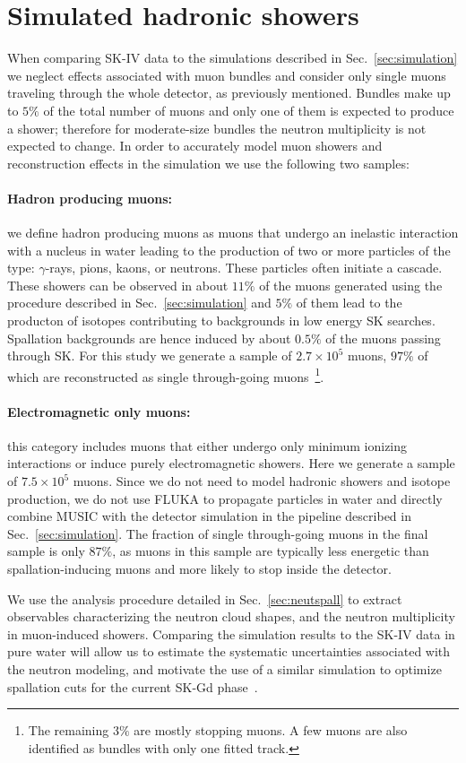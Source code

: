 \section{Simulated hadronic showers}
\label{sec:simucompare}
When comparing SK-IV data to the simulations described in Sec.~\ref{sec:simulation} we neglect effects associated with muon bundles and consider only single muons traveling through the whole detector, as previously mentioned. Bundles make up to $5\%$ of the total number of muons and only one of them is expected to produce a shower; therefore for moderate-size bundles the neutron multiplicity is not expected to change. In order to accurately model muon showers and reconstruction effects in the simulation we use the following two samples:
\paragraph{Hadron producing muons:} we define hadron producing muons as muons that undergo an inelastic interaction with a nucleus in water leading to the production of two or more particles of the type: $\gamma$-rays, pions, kaons, or neutrons. These particles often initiate a cascade. These showers can be observed in about $11\%$ of the muons generated using the procedure described in Sec.~\ref{sec:simulation} and $5\%$ of them lead to the producton of isotopes contributing to backgrounds in low energy SK searches. Spallation backgrounds are hence induced by about $0.5\%$ of the muons passing through SK. For this study we generate a sample of $2.7\times 10^5$ muons, $97\%$ of which are reconstructed as single through-going muons~\footnote{The remaining $3\%$ are mostly stopping muons. A few muons are also identified as bundles with only one fitted track.}.
\paragraph{Electromagnetic only muons:} this category includes muons that either undergo only minimum ionizing interactions or induce purely electromagnetic showers. Here we generate a sample of $7.5\times 10^5$ muons. Since we do not need to model hadronic showers and isotope production, we do not use FLUKA to propagate particles in water and directly combine MUSIC with the detector simulation in the pipeline described in Sec.~\ref{sec:simulation}. The fraction of single through-going muons in the final sample is only $87\%$, as muons in this sample are typically less energetic than spallation-inducing muons and more likely to stop inside the detector.

We use the analysis procedure detailed in Sec.~\ref{sec:neutspall} to extract observables characterizing the neutron cloud shapes, and the neutron multiplicity in muon-induced showers. Comparing the simulation results to the SK-IV data in pure water will allow us to estimate the systematic uncertainties associated with the neutron modeling, and motivate the use of a similar simulation to optimize spallation cuts for the current SK-Gd phase~\cite{SK-Gdloading}.


